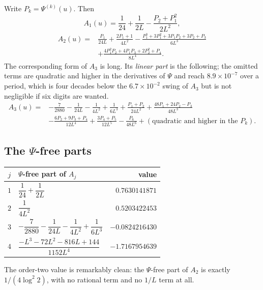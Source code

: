 \documentclass[11pt,oneside]{article}
\theoremstyle{definition}
\theoremstyle{remark}
\begin{document}
Write $P_k=\Psi^{(k)}(u)$.  Then
\[
  A_1(u)=\frac1{24}+\frac1{2L}-\frac{P_2+P_1^2}{2L^2},
\]
\begin{equation}\label{smallarg:eq:A2psi}
\begin{aligned}
  A_2(u)={}&\frac{P_1}{24L}
    +\frac{2P_1+1}{4L^2}
    -\frac{P_1^3+3P_1^2+3P_1P_2+3P_2+P_3}{6L^3}\\
   &+\frac{4P_1^2P_2+4P_1P_3+2P_2^2+P_4}{8L^4}.
\end{aligned}
\end{equation}
The corresponding form of $A_3$ is long.  Its \emph{linear part} is the
following; the omitted terms are quadratic and higher in the derivatives of
$\Psi$ and reach $8.9\times10^{-7}$ over a period, which is four decades
below the $6.7\times10^{-2}$ swing of $A_3$ but is not negligible if six
digits are wanted.
\begin{equation}\label{smallarg:eq:A3psi}
\begin{aligned}
  A_3(u)={}&-\frac7{2880}-\frac1{24L}-\frac1{4L^2}+\frac1{6L^3}
    +\frac{P_1+P_2}{24L^2}
    +\frac{48P_1+24P_2-P_3}{48L^3}\\
   &-\frac{6P_2+9P_3+P_4}{12L^4}
    +\frac{3P_4+P_5}{12L^5}
    -\frac{P_6}{48L^6}
    +(\text{quadratic and higher in the }P_k).
\end{aligned}
\end{equation}

\subsection{The \texorpdfstring{$\Psi$}{Psi}-free parts}

\begin{center}
\begin{tabular}{@{}clr@{}}
\toprule
$j$ & $\Psi$-free part of $A_j$ & value\\
\midrule
$1$ & $\dfrac1{24}+\dfrac1{2L}$ & $0.7630141871$\\[0.6em]
$2$ & $\dfrac1{4L^2}$ & $0.5203422453$\\[0.6em]
$3$ & $-\dfrac7{2880}-\dfrac1{24L}-\dfrac1{4L^2}+\dfrac1{6L^3}$ & $-0.0824216430$\\
$4$ & $\dfrac{-L^3-72L^2-816L+144}{1152L^4}$ & $-1.7167954639$\\
\bottomrule
\end{tabular}
\end{center}

The order-two value is remarkably clean: the $\Psi$-free part of $A_2$ is
exactly $1/(4\log^2 2)$, with no rational term and no $1/L$ term at all.
\end{document}
